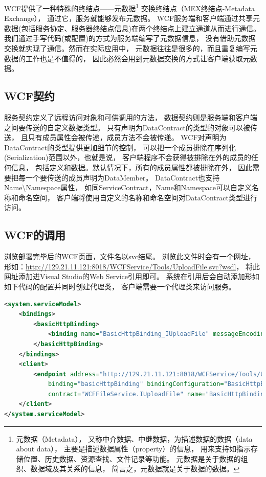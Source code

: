 \documentclass{book}
\begin{document}
WCF提供了一种特殊的终结点——元数据\footnote{元数据（Metadata），
又称中介数据、中继数据，为描述数据的数据（data about data），
主要是描述数据属性（property）的信息，
用来支持如指示存储位置、历史数据、资源查找、文件记录等功能。
元数据是关于数据的组织、数据域及其关系的信息，
简言之，元数据就是关于数据的数据。}
交换终结点（MEX终结点-Metadata Exchange），
通过它，服务就能够发布元数据。
WCF服务端和客户端通过共享元数据(包括服务协定、服务器终结点信息)在两个终结点上建立通道从而进行通信。
我们通过手写代码(或配置)的方式为服务端编写了元数据信息，
没有借助元数据交换就实现了通信。然而在实际应用中，
元数据往往是很多的，而且重复编写元数据的工作也是不值得的，
因此必然会用到元数据交换的方式让客户端获取元数据。

\subsection{WCF契约}

服务契约定义了远程访问对象和可供调用的方法，
数据契约则是服务端和客户端之间要传送的自定义数据类型。
只有声明为DataContract的类型的对象可以被传送，
且只有成员属性会被传递，成员方法不会被传递。
WCF对声明为DataContract的类型提供更加细节的控制，
可以把一个成员排除在序列化(Serialization)范围以外，也就是说，
客户端程序不会获得被排除在外的成员的任何信息，
包括定义和数据。默认情况下，所有的成员属性都被排除在外，
因此需要把每一个要传送的成员声明为DataMember。
DataContract也支持Name\textbackslash Namespace属性，
如同ServiceContract，Name和Namespace可以自定义名称和命名空间，
客户端将使用自定义的名称和命名空间对DataContract类型进行访问。

\subsection{WCF的调用}

浏览部署完毕后的WCF页面，文件名以svc结尾。
浏览此文件时会有一个网址，形如：\url{http://129.21.11.121:8018/WCFService/Tools/UploadFile.svc?wsdl}，
将此网址添加进Visual Studio的Web Service引用即可。
系统在引用后会自动添加形如如下代码的配置并同时创建代理类，
客户端需要一个代理类来访问服务。

\begin{lstlisting}[language=XML]
<system.serviceModel>
    <bindings>
        <basicHttpBinding>
            <binding name="BasicHttpBinding_IUploadFile" messageEncoding="Mtom" />
        </basicHttpBinding>
    </bindings>
    <client>
        <endpoint address="http://129.21.11.121:8018/WCFService/Tools/UploadFile.svc?wsdl"
            binding="basicHttpBinding" bindingConfiguration="BasicHttpBinding_IUploadFile"
            contract="WCFFileService.IUploadFile" name="BasicHttpBinding_IUploadFile" />
    </client>
</system.serviceModel>
\end{lstlisting}
\end{document}
